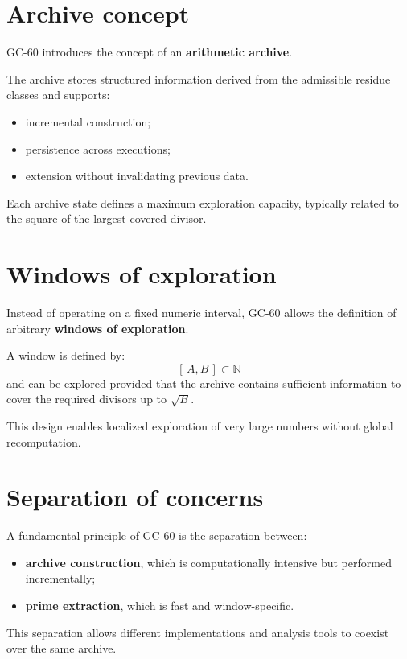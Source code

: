 \documentclass[11pt,a4paper]{article}
\begin{document}
\section*{Archive concept}

GC-60 introduces the concept of an \textbf{arithmetic archive}.

The archive stores structured information derived from the admissible residue classes and supports:
\begin{itemize}[leftmargin=1.5cm]
\item incremental construction;
\item persistence across executions;
\item extension without invalidating previous data.
\end{itemize}

Each archive state defines a maximum exploration capacity, typically related to the square of the largest covered divisor.

\section*{Windows of exploration}

Instead of operating on a fixed numeric interval, GC-60 allows the definition of arbitrary \textbf{windows of exploration}.

A window is defined by:
\[
[\,A, B\,] \subset \mathbb{N}
\]
and can be explored provided that the archive contains sufficient information to cover the required divisors up to \(\sqrt{B}\).

This design enables localized exploration of very large numbers without global recomputation.

\section*{Separation of concerns}

A fundamental principle of GC-60 is the separation between:
\begin{itemize}[leftmargin=1.5cm]
\item \textbf{archive construction}, which is computationally intensive but performed incrementally;
\item \textbf{prime extraction}, which is fast and window-specific.
\end{itemize}

This separation allows different implementations and analysis tools to coexist over the same archive.
\end{document}
